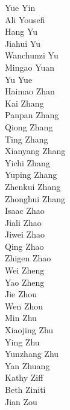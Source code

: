 Yue Yin\\
Ali Yousefi\\
Hang Yu\\
Jiahui Yu\\
Wanchunzi Yu\\
Mingao Yuan\\
Yu Yue\\
Haimao Zhan\\
Kai Zhang\\
Panpan Zhang\\
Qiong Zhang\\
Ting Zhang\\
Xianyang Zhang\\
Yichi Zhang\\
Yuping Zhang\\
Zhenkui Zhang\\
Zhonghui Zhang\\
Isaac Zhao\\
Jiali Zhao\\
Jiwei Zhao\\
Qing Zhao\\
Zhigen Zhao\\
Wei Zheng\\
Yao Zheng\\
Jie Zhou\\
Wen Zhou\\
Min Zhu\\
Xiaojing Zhu\\
Ying Zhu\\
Yunzhang Zhu\\
Yan Zhuang\\
Kathy Ziff\\
Beth Ziniti\\
Jian Zou\\

